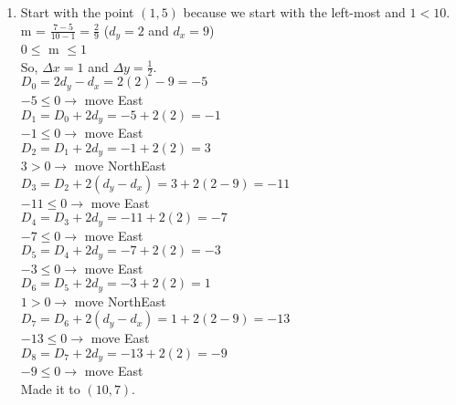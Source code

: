 \documentclass[12pt]{article}
\begin{document}
\begin{enumerate}
\item
Start with the point $(1, 5)$ because we start with the left-most and $1 < 10$. \\
m = $\frac{7-5}{10-1} = \frac{2}{9}$ ($d_y = 2$ and $d_x = 9$) \\
$0 \leq$ m $\leq 1$ \\
So, $\Delta x = 1$ and $\Delta y = \frac{1}{2}$. \\
$D_{0} = 2d_y - d_x = 2(2) - 9 = -5$ \\
$-5 \leq 0 \rightarrow$ move East \\
$D_{1} = D_{0} + 2d_y = -5 + 2(2) = -1$ \\
$-1 \leq 0 \rightarrow$ move East \\
$D_{2} = D_{1} + 2d_y = -1 + 2(2) = 3$ \\
$3 > 0 \rightarrow$ move NorthEast \\
$D_{3} = D_{2} + 2(d_y - d_x) = 3 + 2(2-9) = -11$ \\
$-11 \leq 0 \rightarrow$ move East \\
$D_{4} = D_{3} + 2d_y = -11 + 2(2) = -7$ \\
$-7 \leq 0 \rightarrow$ move East \\
$D_{5} = D_{4} + 2d_y = -7 + 2(2) = -3$ \\
$-3 \leq 0 \rightarrow$ move East \\
$D_{6} = D_{5} + 2d_y = -3 + 2(2) = 1$ \\
$1 > 0 \rightarrow$ move NorthEast \\
$D_{7} = D_{6} + 2(d_y - d_x) = 1 + 2(2-9) = -13$ \\
$-13 \leq 0 \rightarrow$ move East \\
$D_{8} = D_{7} + 2d_y = -13 + 2(2) = -9$ \\
$-9 \leq 0 \rightarrow$ move East \\
Made it to $(10, 7)$.


\end{enumerate}
\end{document}
